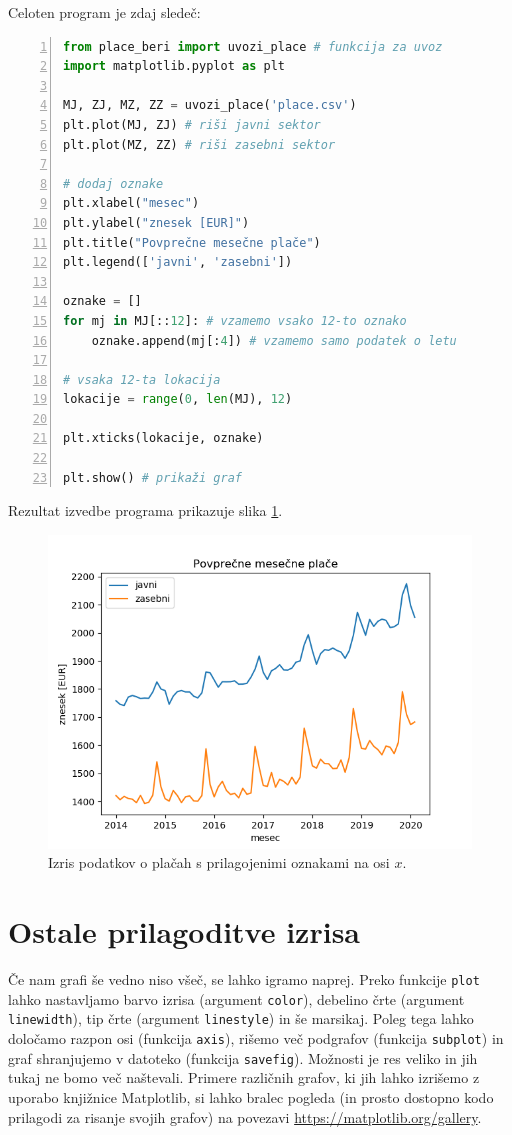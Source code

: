 Celoten program je zdaj sledeč:
\begin{lstlisting}[language=Python, showstringspaces=false,numbers=left]
from place_beri import uvozi_place # funkcija za uvoz
import matplotlib.pyplot as plt

MJ, ZJ, MZ, ZZ = uvozi_place('place.csv')
plt.plot(MJ, ZJ) # riši javni sektor
plt.plot(MZ, ZZ) # riši zasebni sektor

# dodaj oznake
plt.xlabel("mesec")
plt.ylabel("znesek [EUR]")
plt.title("Povprečne mesečne plače")
plt.legend(['javni', 'zasebni'])

oznake = []
for mj in MJ[::12]: # vzamemo vsako 12-to oznako
    oznake.append(mj[:4]) # vzamemo samo podatek o letu

# vsaka 12-ta lokacija
lokacije = range(0, len(MJ), 12) 

plt.xticks(lokacije, oznake)

plt.show() # prikaži graf
\end{lstlisting}
Rezultat izvedbe programa prikazuje slika \ref{img:plt5}.
\begin{figure}
    \includegraphics[width=\linewidth]{img/plt5.png}
    \caption{Izris podatkov o plačah s prilagojenimi oznakami na osi $x$.}
    \label{img:plt5}
\end{figure}

\section{Ostale prilagoditve izrisa}
Če nam grafi še vedno niso všeč, se lahko igramo naprej. Preko funkcije \texttt{plot} lahko nastavljamo barvo izrisa (argument \texttt{color}), debelino črte (argument \texttt{linewidth}), tip črte (argument \texttt{linestyle}) in še marsikaj. Poleg tega lahko določamo razpon osi (funkcija \texttt{axis}), rišemo več podgrafov (funkcija \texttt{subplot}) in graf shranjujemo v datoteko (funkcija \texttt{savefig}). Možnosti je res veliko in jih tukaj ne bomo več naštevali. Primere različnih grafov, ki jih lahko izrišemo z uporabo knjižnice Matplotlib, si lahko bralec pogleda (in prosto dostopno kodo prilagodi za risanje svojih grafov) na povezavi \url{https://matplotlib.org/gallery}.

